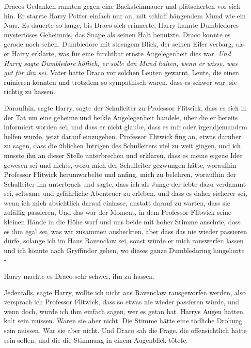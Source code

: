 Dracos Gedanken rannten gegen eine Backsteinmauer und plätscherten vor sich hin.
Er starrte Harry Potter einfach nur an, mit schlaff hängendem Mund wie ein Narr.
Es dauerte so lange, bis Draco sich erinnerte. Harry kannte Dumbledores
mysteriöses Geheimnis, das Snape als seinen Halt benutzte. Draco konnte es
gerade noch sehen. Dumbledore mit strengem Blick, der seinen Eifer verbarg, als
er Harry erklärte, was für eine furchtbar ernste Angelegenheit dies war.
\emph{Und Harry sagte Dumbledore höflich, er solle den Mund halten, wenn er
wisse, was gut für ihn sei}. Vater hatte Draco vor solchen Leuten gewarnt,
Leute, die einen ruinieren konnten und trotzdem so sympathisch waren, dass es
schwer war, sie richtig zu hassen.

\glqq Daraufhin\grqq{}, sagte Harry, \glqq sagte der Schulleiter zu Professor
Flitwick, dass es sich in der Tat um eine geheime und heikle Angelegenheit
handele, über die er bereits informiert worden sei, und dass er nicht glaube,
dass es mir oder irgendjemandem helfen würde, jetzt darauf einzugehen. Professor
Flitwick fing an, etwas darüber zu sagen, dass die üblichen Intrigen des
Schulleiters viel zu weit gingen, und ich musste ihn an dieser Stelle
unterbrechen und erklären, dass es meine eigene Idee gewesen sei und nichts,
wozu mich der Schulleiter gezwungen hätte, woraufhin Professor Flitwick
herumwirbelte und anfing, mich zu belehren, woraufhin der Schulleiter ihn
unterbrach und sagte, dass ich als Junge-der-lebte dazu verdammt sei, seltsame
und gefährliche Abenteuer zu erleben, und dass es daher sicherer sei, wenn ich
mich absichtlich darauf einlasse, anstatt darauf zu warten, dass sie zufällig
passieren, Und das war der Moment, in dem Professor Flitwick seine kleinen Hände
in die Höhe warf und uns beide mit hoher Stimme anschrie, dass es ihm egal sei,
was wir zusammen ausheckten, aber dass das nie wieder passieren dürfe, solange
ich im Haus Ravenclaw sei, sonst würde er mich rauswerfen lassen und ich könnte
nach Gryffindor gehen, wo dieses ganze Dumbledoring hingehörte -\grqq{}

Harry machte es Draco sehr schwer, ihn zu hassen.

\glqq Jedenfalls\grqq{}, sagte Harry, \glqq wollte ich nicht aus Ravenclaw
rausgeworfen werden, also versprach ich Professor Flitwick, dass so etwas nie
wieder passieren würde, und wenn doch, würde ich ihm einfach sagen, wer es getan
hat.\grqq{} Harrys Augen hätten kalt sein müssen. Waren sie aber nicht. Die
Stimme hätte eine tödliche Drohung sein müssen. War sie aber nicht. Und Draco
sah die Frage, die offensichtlich hätte sein sollen, und die die Stimmung in
einem Augenblick tötete.

